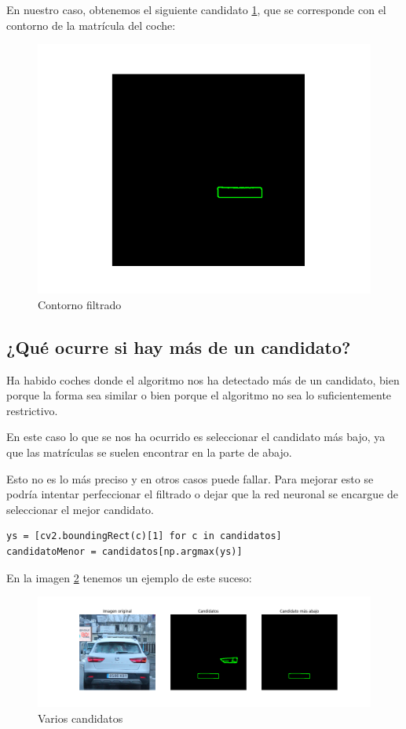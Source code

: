 En nuestro caso, obtenemos el siguiente candidato \ref{coche1FiltroContorno}, que se corresponde con el contorno de la matrícula del coche:
\begin{figure}[H]
    \centering
    \includegraphics[width=.6\linewidth]{Images/coche1FiltroContorno.png}
    \caption{Contorno filtrado}
    \label{coche1FiltroContorno}
\end{figure}

\subsection{¿Qué ocurre si hay más de un candidato?}
Ha habido coches donde el algoritmo nos ha detectado más de un candidato, bien porque la forma sea similar o bien porque el algoritmo no sea lo suficientemente restrictivo.

En este caso lo que se nos ha ocurrido es seleccionar el candidato más bajo, ya que las matrículas se suelen encontrar en la parte de abajo. 

Esto no es lo más preciso y en otros casos puede fallar. Para mejorar esto se podría intentar perfeccionar el filtrado o dejar que la red neuronal se encargue de seleccionar el mejor candidato.
\begin{verbatim}
ys = [cv2.boundingRect(c)[1] for c in candidatos]
candidatoMenor = candidatos[np.argmax(ys)]
\end{verbatim}
En la imagen \ref{coche7Filtrado} tenemos un ejemplo de este suceso:
\begin{figure}[H]
    \centering
    \includegraphics[width=1\linewidth]{Images/coche7Filtrado.png}
    \caption{Varios candidatos}
    \label{coche7Filtrado}
\end{figure}


